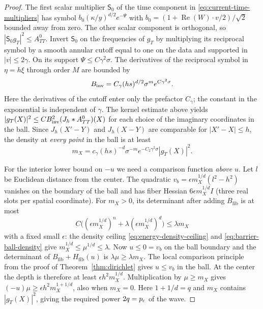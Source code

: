 \begin{proof}
The first scalar multiplier $\mathsf S_0$ of the time component in
\eqref{eq:current-time-multipliers} has symbol
$b_0(\kappa/y)^{d/2}e^{-\Psi}$ with
$b_0=(1+\operatorname{Re}(W)\cdot v/2)/\sqrt{2}$ bounded away from
zero. The other scalar component is orthogonal, so
$|\mathsf S_0g_T|^2\le A^0_{TT}$. Invert $\mathsf S_0$ on the frequencies of $g_T$
by multiplying its reciprocal symbol by a smooth annular cutoff equal
to one on the data and supported in $|v|\le2\gamma$. On its support
$\Psi\le C\gamma^2\sigma$. The derivatives of the reciprocal symbol in
$\eta=h\xi$ through order $M$ are bounded by
\[
 B_{\rm inv}=C_\gamma(hs)^{d/2}\sigma^m e^{C\gamma^2\sigma}.
\]
Here the derivatives of the cutoff enter only the prefactor $C_\gamma$;
the constant in the exponential is independent of $\gamma$.
The kernel estimate above yields
$|g_T(X)|^2\le C B_{\rm inv}^2 (J_h*A^0_{TT})(X)$ for each choice
of the imaginary coordinates in the ball. Since $J_h(X'-Y)$ and
$J_h(X-Y)$ are comparable for $|X'-X|\le h$, the density at
\emph{every point} in the ball is at least
\begin{equation}\label{eq:barrier-ball-density}
 m_X=c_\gamma(hs)^{-d}\sigma^{-m}e^{-C_2\gamma^2\sigma}|g_T(X)|^2.
\end{equation}

For the interior lower bound on $-u$ we need a comparison function
\emph{above} $u$. Let $l$ be Euclidean distance from the center. The quadratic
$v_b=\epsilon m_X^{1/d}(l^2-h^2)$ vanishes on the boundary of the ball
and has fiber Hessian $6\epsilon m_X^{1/d}I$ (three real slots per
spatial coordinate). For $m_X>0$, its determinant after adding
$B_{\mathrm{fib}}$ is at most
\[
 C\big((\epsilon m_X^{1/d})^n+\lambda(\epsilon m_X^{1/d})^d\big)
 \le \lambda m_X
\]
with a fixed small $\epsilon$: the density ceiling
\eqref{eq:energy-density-ceiling} and \eqref{eq:barrier-ball-density}
give $m_X^{1/d}\le\mu^{1/d}\le\lambda$. Now $u\le0=v_b$ on the ball
boundary and the determinant of $B_{\mathrm{fib}}+H_{\mathrm{fib}}(u)$
is $\lambda\mu\ge\lambda m_X$. The local comparison principle from
the proof of Theorem~\ref{thm:dirichlet} gives $u\le v_b$ in the ball.
At the center the depth is therefore at least $\epsilon h^2m_X^{1/d}$.
Multiplication by $\mu\ge m_X$ gives $(-u)\mu\ge\epsilon h^2m_X^{1+1/d}$,
also when $m_X=0$. Here $1+1/d=q$ and $m_X$ contains $|g_T(X)|^2$,
giving the required power $2q=p_{\mathrm c}$ of the wave.


\end{proof}
